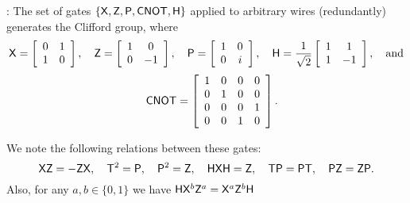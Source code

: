 %
%



\begin{definition}
\label{defn:Clifford+T:family}
 : The set of gates $\{{\sf X}, {\sf Z}, {\sf P}, {\sf CNOT},{\sf H}\}$ applied to arbitrary wires (redundantly) generates the Clifford group, where
$${\sf X} = \left[\begin{array}{cc} 0 & 1\\ 1 & 0\end{array}\right],
\quad{\sf Z} = \left[\begin{array}{cc} 1 & 0\\ 0 & -1\end{array}\right],
\quad{\sf P} = \left[\begin{array}{cc} 1 & 0\\ 0 & i\end{array}\right],
 \quad{\sf H} = \frac{1}{\sqrt{2}}\left[\begin{array}{cc}1 & 1\\1 & -1\end{array}\right], \quad\mbox{and}$$
$$\quad{\sf CNOT} = \left[\begin{array}{cccc} 1 & 0 & 0 & 0\\ 0 & 1 & 0 & 0\\ 0 & 0 & 0 & 1\\ 0 & 0 & 1 & 0\end{array}\right].$$
\end{definition}
We note the following relations between these gates:
$${\sf X}{\sf Z} = - {\sf Z}{\sf X},\quad {\sf T}^2={\sf P},\quad{\sf P}^2={\sf Z},\quad{\sf H}{\sf X}{\sf H}={\sf Z},\quad {\sf T}{\sf P}={\sf P}{\sf T},\quad{\sf P}{\sf Z}={\sf Z}{\sf P}.$$
Also, for any $a,b\in\{0,1\}$ we have
${\sf H}{\sf X}^b{\sf Z}^a={\sf X}^a{\sf Z}^b {\sf H}$

